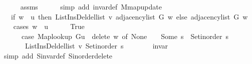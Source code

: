 \begin{isabellebody}
\ \ \ \ \isamarkupfalse%
\ assms\isanewline
\ \ \ \ \isamarkupfalse%
\ {\isacharparenleft}{\kern0pt}simp\ add{\isacharcolon}{\kern0pt}\ invar{\isacharunderscore}{\kern0pt}def\ M{\isachardot}{\kern0pt}map{\isacharunderscore}{\kern0pt}update{\isacharparenright}{\kern0pt}\isanewline
\ \ \isamarkupfalse%
\ \isamarkupfalse%
\ {\isachardoublequoteopen}{\isachardot}{\kern0pt}{\isachardot}{\kern0pt}{\isachardot}{\kern0pt}\ {\isacharequal}{\kern0pt}\ {\isacharparenleft}{\kern0pt}if\ w\ {\isacharequal}{\kern0pt}\ {\isacharquery}{\kern0pt}u\ then\ List{\isacharunderscore}{\kern0pt}Ins{\isacharunderscore}{\kern0pt}Del{\isachardot}{\kern0pt}del{\isacharunderscore}{\kern0pt}list\ {\isacharquery}{\kern0pt}v\ {\isacharparenleft}{\kern0pt}adjacency{\isacharunderscore}{\kern0pt}list\ G\ w{\isacharparenright}{\kern0pt}\ else\ adjacency{\isacharunderscore}{\kern0pt}list\ G\ w{\isacharparenright}{\kern0pt}{\isachardoublequoteclose}\isanewline
\ \ \isamarkupfalse%
\ {\isacharparenleft}{\kern0pt}cases\ {\isachardoublequoteopen}w\ {\isacharequal}{\kern0pt}\ {\isacharquery}{\kern0pt}u{\isachardoublequoteclose}{\isacharparenright}{\kern0pt}\isanewline
\ \ \ \ \isamarkupfalse%
\ True\isanewline
\ \ \ \ \isamarkupfalse%
\isanewline
\ \ \ \ \ \ {\isachardoublequoteopen}{\isacharparenleft}{\kern0pt}case\ {\isacharparenleft}{\kern0pt}Map{\isacharunderscore}{\kern0pt}lookup\ G{\isacharparenleft}{\kern0pt}{\isacharquery}{\kern0pt}u\ {\isasymmapsto}\ {\isacharquery}{\kern0pt}delete{\isacharparenright}{\kern0pt}{\isacharparenright}{\kern0pt}\ w\ of\ None\ {\isasymRightarrow}\ {\isacharbrackleft}{\kern0pt}{\isacharbrackright}{\kern0pt}\ {\isacharbar}{\kern0pt}\ Some\ s\ {\isasymRightarrow}\ Set{\isacharunderscore}{\kern0pt}inorder\ s{\isacharparenright}{\kern0pt}\ {\isacharequal}{\kern0pt}\isanewline
\ \ \ \ \ \ \ List{\isacharunderscore}{\kern0pt}Ins{\isacharunderscore}{\kern0pt}Del{\isachardot}{\kern0pt}del{\isacharunderscore}{\kern0pt}list\ {\isacharquery}{\kern0pt}v\ {\isacharparenleft}{\kern0pt}Set{\isacharunderscore}{\kern0pt}inorder\ s{\isacharparenright}{\kern0pt}{\isachardoublequoteclose}\isanewline
\ \ \ \ \ \ \isamarkupfalse%
\ invar\isanewline
\ \ \ \ \ \ \isamarkupfalse%
\ {\isacharparenleft}{\kern0pt}simp\ add{\isacharcolon}{\kern0pt}\ S{\isachardot}{\kern0pt}invar{\isacharunderscore}{\kern0pt}def\ S{\isachardot}{\kern0pt}inorder{\isacharunderscore}{\kern0pt}delete{\isacharparenright}{\kern0pt}\isanewline
\ \ \ \ \isamarkupfalse%

\end{isabellebody}
